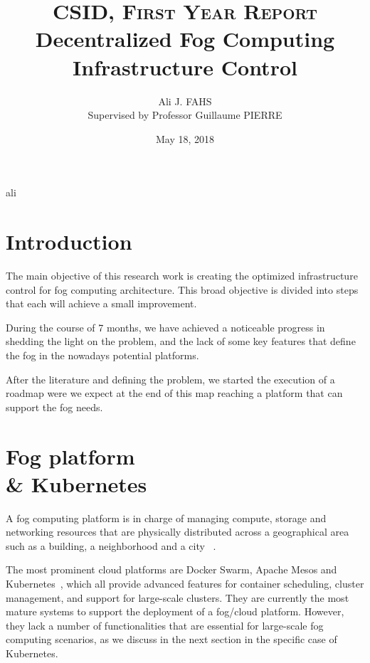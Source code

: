 \documentclass[10pt,twocolumn,letterpaper]{article}
\title{
        \usefont{OT1}{bch}{b}{n}
        \normalfont \normalsize \textsc{CSID, First Year Report} \\ [10pt]
        \huge  Decentralized Fog Computing Infrastructure Control
}
\author{Ali J. FAHS \\
Supervised by Professor Guillaume PIERRE}
\date{May 18, 2018}
\affil{\small{Univ Rennes, Inria, CNRS, IRISA}}
\begin{document}

ali 
{\let\newpage\relax\maketitle}

\section{Introduction}
The main objective of this research work is creating the optimized infrastructure control for fog computing architecture. This broad objective is divided into steps that each will achieve a small improvement. 

During the course of 7 months, we have achieved a noticeable progress in shedding the light on the problem, and the lack of some key features that define the fog in the nowadays potential platforms. 

After the literature and defining the problem, we started the execution of a roadmap were we expect at the end of this map reaching a platform that can support the fog needs. 

\section{Fog platform \\ \& Kubernetes }

A fog computing platform is in charge of managing compute, storage and networking resources that are physically distributed across a geographical area such as a building, a neighborhood and a city ~\cite{bonomi2014, fogecosystem}.

The most prominent cloud platforms are Docker Swarm, Apache Mesos and Kubernetes~\cite{burns2016borg}, which all provide advanced features for container scheduling, cluster management, and support for large-scale clusters. They are currently the most mature systems to support the deployment of a fog/cloud platform. However, they lack a number of functionalities that are essential for large-scale fog computing scenarios, as we discuss in
the next section in the specific case of Kubernetes.
\end{document}
